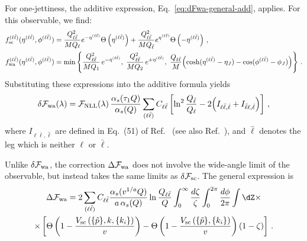 For one-jettiness, the additive expression, Eq.~\eqref{eq:dFwa-general-add}, applies. For this observable, we find:
\begin{equation}
\begin{aligned}
	&f_{\rm sc}^{(\ell\bar\ell)}(\eta^{(\ell\bar\ell)},\phi^{(\ell\bar\ell)})=\frac{Q_{\ell\bar\ell}^2}{MQ_{\ell}}e^{-\eta^{(\ell\bar\ell)}}\Theta\left(\eta^{(\ell\bar\ell)}\right)+\frac{Q_{\ell\bar\ell}^2}{MQ_{\bar\ell}}e^{\eta^{(\ell\bar\ell)}}\Theta\left(-\eta^{(\ell\bar\ell)}\right)\,,\\
	&f_{\rm wa}^{(\ell\bar\ell)}(\eta^{(\ell\bar\ell)},\phi^{(\ell\bar\ell)}) =
\min\left\{
\frac{Q_{\ell\bar\ell}^2}{MQ_1}\,e^{-\eta^{(\ell\bar\ell)}},\;
\frac{Q_{\ell\bar\ell}^2}{MQ_2}\,e^{+\eta^{(\ell\bar\ell)}},\;
\frac{Q_{\ell\bar\ell}}{M}\!\left(\cosh(\eta^{(\ell\bar\ell)}-\eta_J)
-\cos(\phi^{(\ell\bar\ell)}-\phi_J)\right)
\right\}\,.
\end{aligned}
\end{equation}
Substituting these expressions into the additive formula yields
\begin{equation}
    \delta\mathcal{F}_{\mathrm{wa}}(\lambda) =
    \mathcal{F}_{\rm NLL}(\lambda)\,
    \frac{\alpha_s(\tau_1 Q)}{\alpha_s(Q)}
    \sum_{(\ell\bar\ell)}C_{\ell\bar\ell}
    \left[\ln^2\frac{Q_{\bar\ell}}{Q_\ell}
    - 2\!\left(I_{\ell\bar\ell,\hat\ell}
    + I_{\bar\ell\ell,\hat\ell}\right)\right]\,,
\end{equation}
where $I_{\ell\bar\ell,\hat\ell}$ are defined in Eq.~(51) of
Ref.~\cite{Alioli:2023rxx} (see also Ref.~\cite{Jouttenus:2011wh}),
and $\hat\ell$ denotes the leg which is neither  $\ell$ or $\bar\ell$.

Unlike $\delta\mathcal{F}_{\rm wa}$, the correction
$\Delta\mathcal{F}_{\rm wa}$ does not involve the wide-angle limit of the
observable, but instead takes the same limits as $\delta\mathcal{F}_{\rm sc}$. The general expression is
\begin{multline}
\label{eq:DFwa-general}
	\Delta\mathcal{F}_{\mathrm{wa}}=2\sum_{(\ell\bar\ell)}C_{\ell\bar\ell}\frac{\alpha_s(v^{1/a}Q)}{a\,\alpha_s(Q)}\ln\frac{Q_{\ell\bar\ell}}{Q}\int_0^\infty \frac{d\zeta}{\zeta}
	\int_0^{2\pi}\frac{d\phi}{2\pi}\int \dZ\times \\
	\times \left[\Theta\left(1-\frac{V_{\mathrm{sc}}\left(\{\tilde{p}\}, k,\{k_i\}\right)}{v}\right) -\Theta\left(1-\frac{V_{\mathrm{sc}}\left(\{\tilde{p}\}, \{k_i\}\right)}{v}\right)\left(1-\zeta\right)\right]\,.
\end{multline}

